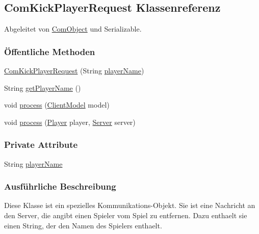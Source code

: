 \hypertarget{a00034}{\subsection{Com\-Kick\-Player\-Request Klassenreferenz}
\label{a00034}
}


Abgeleitet von \hyperlink{a00037}{Com\-Object} und Serializable.

\subsubsection*{Öffentliche Methoden}
\begin{DoxyCompactItemize}
\item 
\hyperlink{a00034_ae62e08a885d902a978f355560928a796}{Com\-Kick\-Player\-Request} (String \hyperlink{a00034_a12adf3f64463f614eb3af6dd82414e0a}{player\-Name})
\item 
String \hyperlink{a00034_a8cd2886758be9855ae14404540d4873d}{get\-Player\-Name} ()
\item 
void \hyperlink{a00034_a758d7005755a181717f238f714d87dd2}{process} (\hyperlink{a00003}{Client\-Model} model)
\item 
void \hyperlink{a00034_ac67b5ce3ec03d48ef1e6caad6e49c902}{process} (\hyperlink{a00076}{Player} player, \hyperlink{a00077}{Server} server)
\end{DoxyCompactItemize}
\subsubsection*{Private Attribute}
\begin{DoxyCompactItemize}
\item 
\hypertarget{a00034_a12adf3f64463f614eb3af6dd82414e0a}{String \hyperlink{a00034_a12adf3f64463f614eb3af6dd82414e0a}{player\-Name}}\label{a00034_a12adf3f64463f614eb3af6dd82414e0a}

\end{DoxyCompactItemize}


\subsubsection{Ausführliche Beschreibung}
Diese Klasse ist ein spezielles Kommunikations-\/\-Objekt. Sie ist eine Nachricht an den Server, die angibt einen Spieler vom Spiel zu entfernen. Dazu enthaelt sie einen String, der den Namen des Spielers enthaelt. 

